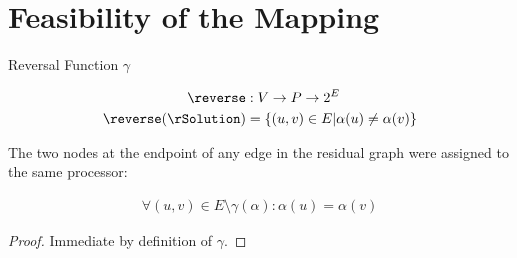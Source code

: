 \section{Feasibility of the Mapping}

\begin{definition}
Reversal Function $\gamma$

\begin{align}
	\nonumber \reverse & : V \rightarrow P \rightarrow 2^E \\
	\nonumber \reverse(\rSolution) & = \{(u,v) \in E | \alpha(u) \neq \alpha(v)\}
\end{align}
\end{definition}

\begin{lemma}
\label{EDGEASSIGN}
The two nodes at the endpoint of any edge in the residual graph were assigned to the same processor:

\begin{align}
	\nonumber \forall(u, v) \in E \setminus \gamma(\alpha) : \alpha(u) = \alpha(v)
\end{align}
\end{lemma}
\begin{proof}
Immediate by definition of $\gamma$.
\end{proof}

